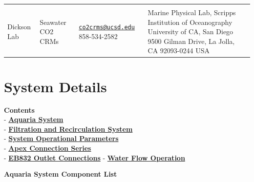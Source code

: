 \documentclass[]{book}
\begin{document}
\begin{longtable}[]{@{}llll@{}}
\begin{minipage}[t]{0.18\columnwidth}
\end{minipage}\tabularnewline
\begin{minipage}[t]{0.18\columnwidth}\raggedright\strut
Dickson Lab\strut
\end{minipage} & \begin{minipage}[t]{0.25\columnwidth}\raggedright\strut
Seawater CO2 CRMs\strut
\end{minipage} & \begin{minipage}[t]{0.28\columnwidth}\raggedright\strut
\href{mailto:co2crms@ucsd.edu}{\nolinkurl{co2crms@ucsd.edu}}
858-534-2582\strut
\end{minipage} & \begin{minipage}[t]{0.18\columnwidth}\raggedright\strut
Marine Physical Lab, Scripps Institution of Oceanography University of
CA, San Diego 9500 Gilman Drive, La Jolla, CA 92093-0244 USA\strut
\end{minipage}\tabularnewline
\bottomrule
\end{longtable}

\hypertarget{system-details}{\chapter{System
Details}\label{system-details}}

\textbf{Contents}\\
- \protect\hyperlink{Aquaria_System_List}{\textbf{Aquaria System}}\\
-
\protect\hyperlink{Filtration_and_Recirculation_System}{\textbf{Filtration
and Recirculation System}}\\
- \protect\hyperlink{System_Operation_Parameters}{\textbf{System
Operational Parameters}}\\
- \protect\hyperlink{Apex_Connection_Series}{\textbf{Apex Connection
Series}}\\
- \protect\hyperlink{EB832_Outlet_Connections}{\textbf{EB832 Outlet
Connections}} - \protect\hyperlink{Water_Flow_Operation}{\textbf{Water
Flow Operation}}

 \textbf{Aquaria System Component List}
\end{document}
